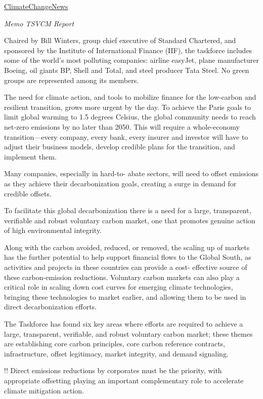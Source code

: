 \documentclass[
]{book}
\begin{document}
\href{https://www.climatechangenews.com/2021/01/27/carneys-carbon-offset-taskforce-ducks-environmental-integrity-questions/}{ClimateChangeNews}

\emph{Memo TSVCM Report}

Chaired by Bill Winters, group chief executive of Standard Chartered, and sponsored by the Institute of International Finance (IIF), the taskforce includes some of the world's most polluting companies: airline easyJet, plane manufacturer Boeing, oil giants BP, Shell and Total, and steel producer Tata Steel. No green groups are represented among its members.

The need for climate action, and tools to
mobilize finance for the low-carbon and
resilient transition, grows more urgent by the
day. To achieve the Paris goals to limit global
warming to 1.5 degrees Celsius, the global
community needs to reach net-zero emissions
by no later than 2050. This will require a
whole-economy transition---every company,
every bank, every insurer and investor
will have to adjust their business models,
develop credible plans for the transition, and
implement them.

Many companies, especially in hard-to-
abate sectors, will need to offset emissions
as they achieve their decarbonization goals,
creating a surge in demand for credible
offsets.

To facilitate this global
decarbonization there is a need for a large,
transparent, verifiable and robust voluntary
carbon market, one that promotes genuine
action of high environmental integrity.

Along with the carbon avoided, reduced, or
removed, the scaling up of markets has the
further potential to help support financial
flows to the Global South, as activities and
projects in these countries can provide a cost-
effective source of these carbon-emission
reductions. Voluntary carbon markets can
also play a critical role in scaling down cost
curves for emerging climate technologies,
bringing these technologies to market earlier,
and allowing them to be used in direct
decarbonization efforts.

The Taskforce has found
six key areas where efforts are required
to achieve a large, transparent, verifiable,
and robust voluntary carbon market;
these themes are establishing core carbon
principles, core carbon reference contracts,
infrastructure, offset legitimacy, market
integrity, and demand signaling.

!! Direct
emissions reductions by corporates must
be the priority, with appropriate offsetting
playing an important complementary role
to accelerate climate mitigation action.
\end{document}
